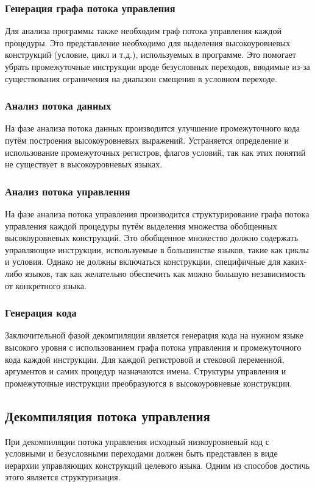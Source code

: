 \documentclass[14pt]{extarticle}
\begin{document}
\subsubsection*{Генерация графа потока управления}
Для анализа программы также необходим граф потока управления каждой процедуры. Это представление необходимо для выделения высокоуровневых конструкций (условие, цикл и т.д.), используемых в программе. Это помогает убрать промежуточные инструкции вроде безусловных переходов, вводимые из-за существования ограничения на диапазон смещения в условном переходе.
\subsubsection*{Анализ потока данных} 
На фазе анализа потока данных производится улучшение промежуточного кода путём построения высокоуровневых выражений. Устраняется определение и использование промежуточных регистров, флагов условий, так как этих понятий не существует в высокоуровневых языках.
\subsubsection*{Анализ потока управления} 
На фазе анализа потока управления производится структурирование графа потока управления каждой процедуры путём выделения множества обобщенных высокоуровневых конструкций. Это обобщенное множество должно содержать управляющие инструкции, используемые в большинстве языков, такие как циклы и условия. Однако не должны включаться конструкции, специфичные для каких-либо языков, так как желательно обеспечить как можно большую независимость от конкретного языка.
\subsubsection*{Генерация кода} 
Заключительной фазой декомпиляции является генерация кода на нужном языке высокого уровня с использованием графа потока управления и промежуточного кода каждой инструкции. Для каждой регистровой и стековой переменной, аргументов и самих процедур назначаются имена. Структуры управления и промежуточные инструкции преобразуются в высокоуровневые конструкции.

\pagebreak

\subsection{Декомпиляция потока управления}

При декомпиляции потока управления исходный низкоуровневый код с условными и безусловными переходами должен быть представлен в виде иерархии управляющих конструкций целевого языка. Одним из способов достичь этого является структуризация.
\end{document}
